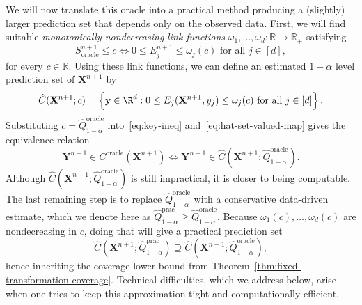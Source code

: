 {We will now translate this oracle into a practical method producing a (slightly) larger prediction set that depends only on the observed data. 
First, we will find suitable {\em monotonically nondecreasing} {\em link functions} $\omega_1, \ldots, \omega_d : \mathbb{R} \to \mathbb{R}_+$ satisfying 
\begin{equation}
S_{\mathrm{oracle}}^{n+1} \le c 
\iff 
0\leq {E}^{n+1}_j \le \omega_j(c)\text{ for all } j \in [d],
\label{eq:key-ineq}
\end{equation}
for every $c \in \mathbb{R}$. Using these link functions, we can define an estimated $1-\alpha$ level prediction set of $\mathbf{X}^{n+1}$ by
\begin{equation}
\hat{C}(\mathbf{X}^{n+1}; c) = \left\{\mathbf y \in \R^d: 0\leq E_j(\mathbf{X}^{n+1}, y_j) \leq \omega_j(c)\text{ for all } j \in [d]\right\}.  
\label{eq:hat-set-valued-map}
\end{equation}
Substituting $c = \hat{Q}^{\mathrm{oracle}}_{1-\alpha}$ into~\eqref{eq:key-ineq} and~\eqref{eq:hat-set-valued-map} gives the equivalence relation
\begin{equation} \label{eq:oracle-dual}
\mathbf{Y}^{n+1} \in {C}^{\mathrm{oracle}}(\mathbf{X}^{n+1}) \iff \mathbf{Y}^{n+1} \in \hat{C}(\mathbf{X}^{n+1}; \hat{Q}^{\mathrm{oracle}}_{1-\alpha}).
\end{equation}
Although $\hat{C}(\mathbf{X}^{n+1}; \hat{Q}^{\mathrm{oracle}}_{1-\alpha})$ is still impractical, it is closer to being computable.
The last remaining step is to replace $\hat{Q}^{\mathrm{oracle}}_{1-\alpha}$ with a conservative data-driven estimate, which we denote here as $\hat{Q}^\mathrm{prac}_{1-\alpha} \geq \hat{Q}^{\mathrm{oracle}}_{1-\alpha}$. Because $\omega_1(c),\ldots,\omega_d(c)$ are nondecreasing in $c$, doing that will give a practical prediction set
\begin{equation} \label{eq:trans-oracle-upper-bound}
\hat{C}(\mathbf{X}^{n+1}; \hat{Q}^\mathrm{prac}_{1-\alpha})
\supseteq \hat{C}(\mathbf{X}^{n+1}; \hat{Q}^{\mathrm{oracle}}_{1-\alpha}),
\end{equation}
hence inheriting the coverage lower bound from Theorem~\ref{thm:fixed-transformation-coverage}.}
Technical difficulties, which we address below, arise when one tries to keep this approximation tight and computationally efficient.

